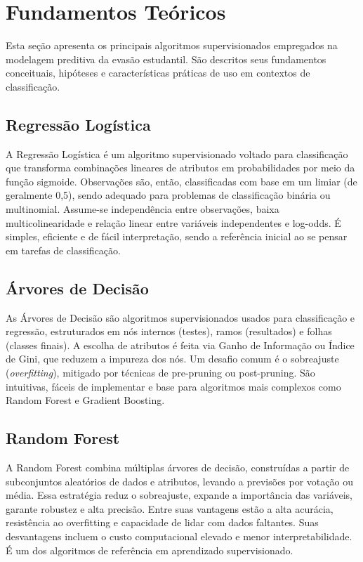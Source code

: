 \documentclass[english, spanish, brazilian]{RBIEarticle} %
\begin{document}
\section{Fundamentos Teóricos}
Esta seção apresenta os principais algoritmos supervisionados empregados na modelagem
preditiva da evasão estudantil. São descritos seus fundamentos conceituais, hipóteses e
características práticas de uso em contextos de classificação.

\subsection{Regressão Logística}
A Regressão Logística é um algoritmo supervisionado voltado para classificação que transforma combinações lineares de atributos em probabilidades por meio da função sigmoide. Observações são, então, classificadas com base em um limiar (de geralmente 0,5), sendo adequado para problemas de classificação binária ou multinomial. Assume-se independência entre observações, baixa multicolinearidade e relação linear entre variáveis independentes e log-odds. É simples, eficiente e de fácil interpretação, sendo a referência inicial ao se pensar em tarefas de classificação.

\subsection{Árvores de Decisão}
As Árvores de Decisão são algoritmos supervisionados usados para classificação e regressão, estruturados em nós internos (testes), ramos (resultados) e folhas (classes finais). A escolha de atributos é feita via Ganho de Informação ou Índice de Gini, que reduzem a impureza dos nós. Um desafio comum é o sobreajuste (\textit{overfitting}), mitigado por técnicas de pre-pruning ou post-pruning. São intuitivas, fáceis de implementar e base para algoritmos mais complexos como Random Forest e Gradient Boosting.

\subsection{Random Forest}
A Random Forest combina múltiplas árvores de decisão, construídas a partir de subconjuntos aleatórios de dados e atributos, levando a previsões por votação ou média. Essa estratégia reduz o sobreajuste, expande a importância das variáveis, garante robustez e alta precisão. Entre suas vantagens estão a alta acurácia, resistência ao overfitting e capacidade de lidar com dados faltantes. Suas desvantagens incluem o custo computacional elevado e menor interpretabilidade. É um dos algoritmos de referência em aprendizado supervisionado.
\end{document}
